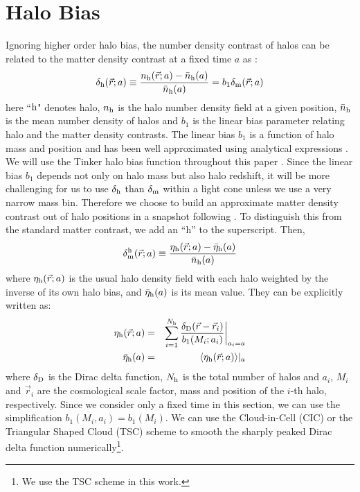 \documentclass[prd,amsmath,amssymb,floatfix,superscriptaddress,nofootinbib,twocolumn]{revtex4-1}
\def\be{\begin{equation}}
\def\ee{\end{equation}}
\def\bea{\begin{eqnarray}}
\def\eea{\end{eqnarray}}
\newcommand{\vrr}{\vec{r}}
\newcommand{\eql}[1]{\label{eq:#1}}
\newcommand\dmh{\delta_{\rm m}^{\rm h}}
\begin{document}
\section{Halo Bias} \label{sec2}
Ignoring higher order halo bias, the number density contrast of halos can be related to the matter density contrast at a fixed time $a$ as \cite{Desjacques:2018rev}:
\be 
\delta_{\rm h}(\vrr;a) \equiv \frac{n_{\rm h}(\vrr;a)-\bar{n}_{\rm h}(a)}{\bar{n}_{\rm h}(a)}=b_{1}\delta_{\rm m}(\vrr;a) \eql{hdc}
\ee 
here ``$\rm h$" denotes halo, $n_{\rm h}$ is the halo number density field at a given position, $\bar{n}_{\rm h}$ is the mean number density of halos and $b_{1}$ is the linear bias parameter relating halo and the matter density contrasts. The linear bias $b_{1}$ is a function of halo mass and position and has been well approximated using analytical expressions \cite{Seljak:2004SW}\cite{Bhattacharya:2011MF}. We will use the Tinker halo bias function throughout this paper \cite{Tinker:2010Tinker}. Since the linear bias $b_1$ depends not only on halo mass but also halo redshift, it will be more challenging for us to use $\delta_{\rm h}$ than $\delta_{\rm m}$ within a light cone unless we use a very narrow mass bin. Therefore we choose to build an approximate matter density contrast out of halo positions in a snapshot following \cite{Pervical:2007GPS}. To distinguish this from the standard matter contrast, we add an ``h'' to the superscript. Then,
\be 
\dmh(\vrr;a) \equiv \frac{\eta_{\rm h}(\vrr;a)-\bar{\eta}_{\rm h}(a)}{\bar{n}_{\rm h}(a)} \eql{hm}
\ee 
where $\eta_{\rm h}(\vrr;a)$ is the usual halo density field with each halo weighted by the inverse of its own halo bias, and $\bar{\eta}_{\rm h}(a)$ is its mean value. They can be explicitly written as:
\bea
\eta_{\rm h}(\vrr;a)&=&\sum_{i=1}^{N_{\rm h}}\frac{\delta_{\rm D}(\vrr-\vrr_{i})}{b_{1}(M_{i};a_{i})}\bigg|_{a_{i}=a} \eql{wnob}\\
\bar{\eta}_{\rm h}(a)&=&\langle \eta_{\rm h}(\vrr;a)\rangle|_{a} \eql{nob}
\eea
where $\delta_{\rm D}$ is the Dirac delta function, $N_{\rm h}$ is the total number of halos and $a_{i}$, $M_{i}$ and $\vrr_{i}$ are the cosmological scale factor, mass and position of the $i$-th halo, respectively. Since we consider only a fixed time in this section, we can use the simplification $b_{1}(M_{i},a_{i})=b_{1}(M_i)$. We can use the Cloud-in-Cell (CIC) or the Triangular Shaped Cloud (TSC) scheme \cite{Sefusatti:2015CIC} to smooth the sharply peaked Dirac delta function numerically\footnote{We use the TSC scheme in this work.}.
\end{document}
